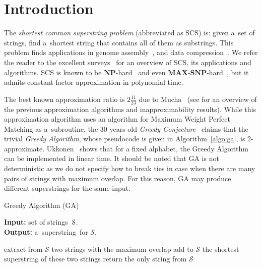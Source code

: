 \section{Introduction}
\label{sec:intro}
The {\em shortest common superstring problem} (abbreviated as SCS) is:
given a~set of strings, find a~shortest string that contains all of them as
substrings. This problem finds applications in genome assembly~\cite{waterman1995introduction, pevzner2001eulerian}, and data compression~\cite{GMS1980, phdthesis, storer1987data}. We refer the reader to the excellent surveys~\cite{gevezes2014shortest, mucha2007tutorial} for an overview of SCS, its applications and algorithms.  SCS is known to be $\mathbf{NP}$-hard~\cite{GMS1980} and even $\mathbf{MAX}$-$\mathbf{SNP}$-hard~\cite{BJLTY1991}, but it admits constant-factor approximation in polynomial time.

The best known approximation ratio is $2\frac{11}{23}$ due to Mucha~\cite{M2013} 
(see \cite[Section~2.1]{GKM13} for an overview of the 
previous approximation algorithms
and inapproximability results). While this approximation algorithm uses an algorithm for Maximum Weight Perfect Matching as a~subroutine, the $30$ years old \emph{Greedy Conjecture}~\cite{storer1987data, TU1988, T1989, BJLTY1991} claims that the trivial \emph{Greedy Algorithm}, whose pseudocode is given in Algorithm~\ref{algo:ga}, is 2-approximate. Ukkonen~\cite{ukkonen1990linear} shows that for a fixed alphabet, the Greedy Algorithm can be implemented in linear time. It should be noted that GA is not deterministic as we do not specify how to break ties in case when there are many pairs of strings with maximum overlap. For this reason, GA may produce different superstrings for the same input.


\begin{algorithm}[ht]
\label{algo:ga}
\caption{Greedy Algorithm (GA)}
\hspace*{\algorithmicindent} \textbf{Input:} set of strings~${\cal S}$.\\
\hspace*{\algorithmicindent} \textbf{Output:} a~superstring~for $\mathcal{S}$.
\begin{algorithmic}[1]
\State extract from $\mathcal{S}$ two strings with the maximum overlap
\State add to $\mathcal{S}$ the shortest superstring of these two strings
\EndWhile
\State return the only string from $\mathcal{S}$
\end{algorithmic}
\end{algorithm}

